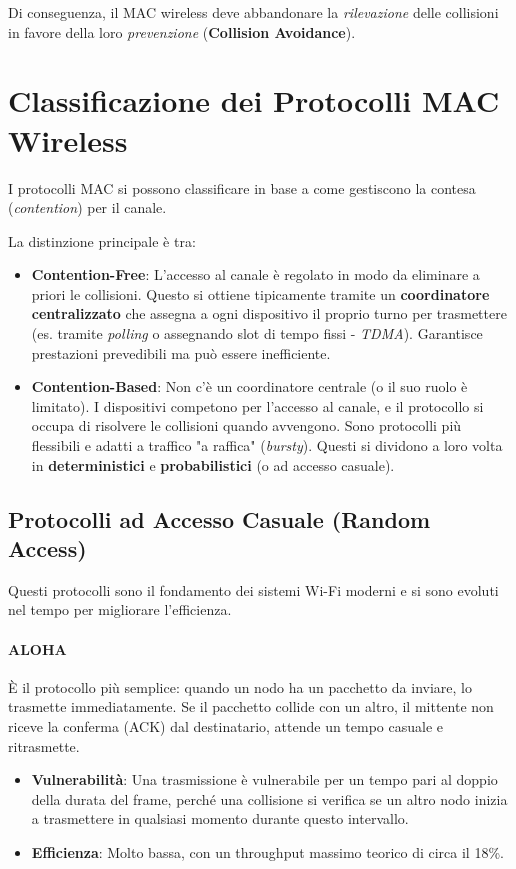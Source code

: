 Di conseguenza, il MAC wireless deve abbandonare la \textit{rilevazione} delle collisioni in favore della loro \textit{prevenzione} (\textbf{Collision Avoidance}).

\section{Classificazione dei Protocolli MAC Wireless}
I protocolli MAC si possono classificare in base a come gestiscono la contesa (\textit{contention}) per il canale.


La distinzione principale è tra:
\begin{itemize}
    \item \textbf{Contention-Free}: L'accesso al canale è regolato in modo da eliminare a priori le collisioni. Questo si ottiene tipicamente tramite un \textbf{coordinatore centralizzato} che assegna a ogni dispositivo il proprio turno per trasmettere (es. tramite \textit{polling} o assegnando slot di tempo fissi - \textit{TDMA}). Garantisce prestazioni prevedibili ma può essere inefficiente.
    \item \textbf{Contention-Based}: Non c'è un coordinatore centrale (o il suo ruolo è limitato). I dispositivi competono per l'accesso al canale, e il protocollo si occupa di risolvere le collisioni quando avvengono. Sono protocolli più flessibili e adatti a traffico "a raffica" (\textit{bursty}). Questi si dividono a loro volta in \textbf{deterministici} e \textbf{probabilistici} (o ad accesso casuale).
\end{itemize}

\subsection{Protocolli ad Accesso Casuale (Random Access)}
Questi protocolli sono il fondamento dei sistemi Wi-Fi moderni e si sono evoluti nel tempo per migliorare l'efficienza.

\paragraph{ALOHA}
È il protocollo più semplice: quando un nodo ha un pacchetto da inviare, lo trasmette immediatamente. Se il pacchetto collide con un altro, il mittente non riceve la conferma (ACK) dal destinatario, attende un tempo casuale e ritrasmette.
\begin{itemize}
    \item \textbf{Vulnerabilità}: Una trasmissione è vulnerabile per un tempo pari al doppio della durata del frame, perché una collisione si verifica se un altro nodo inizia a trasmettere in qualsiasi momento durante questo intervallo.
    \item \textbf{Efficienza}: Molto bassa, con un throughput massimo teorico di circa il 18\%.
\end{itemize}

